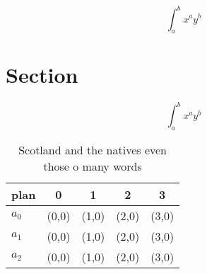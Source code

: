 \documentclass[a4paper]{article}
\begin{document}
\[ \int_{a}^{b}{x^{a}y^{b}} \]

\section{Section}

\[ \int_{a}^{b}{x^{a}y^{b}} \]

\begin{table}
\begin{adjustbox}{width=0.5\columnwidth}
\begin{tabular}{|l|l|l|l|l|}
\hline
\textbf{plan} & \multicolumn{1}{c|}{\textbf{0}} & \multicolumn{1}{c|}{\textbf{1}} & \multicolumn{1}{c|}{\textbf{2}} & \multicolumn{1}{c|}{\textbf{3}} \\ \hline
\textbf{$a_0$}  & (0,0) & (1,0) & (2,0) & (3,0) \\ \hline
\textbf{$a_1$}  & (0,0) & (1,0) & (2,0) & (3,0) \\ \hline
\textbf{$a_2$}  & (0,0) & (1,0) & (2,0) & (3,0) \\ \hline
\end{tabular}
\end{adjustbox}
\caption{Scotland and the natives even those o many words 
}
\end{table}
\end{document}
